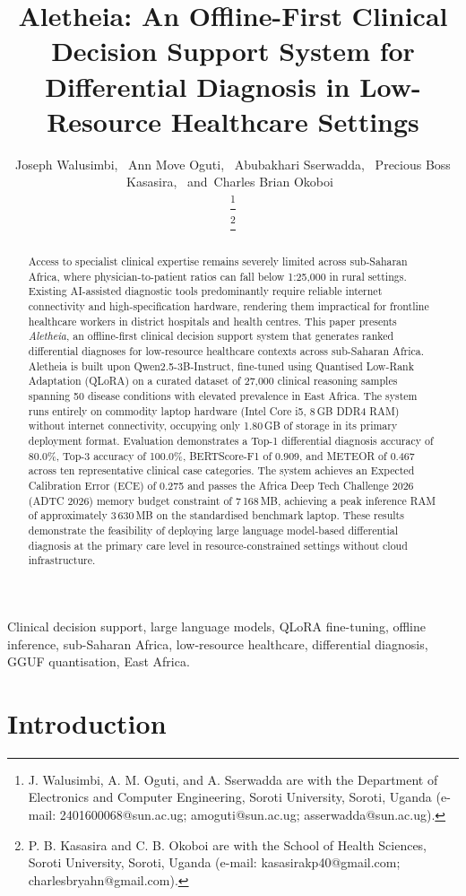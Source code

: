 \documentclass[journal]{IEEEtran}
\title{Aletheia: An Offline-First Clinical Decision Support
System for Differential Diagnosis in Low-Resource Healthcare Settings}
\author{Joseph Walusimbi,~\IEEEmembership{}
  Ann Move Oguti,~\IEEEmembership{}
  Abubakhari Sserwadda,~\IEEEmembership{}
  Precious Boss Kasasira,~\IEEEmembership{}
  and~Charles Brian Okoboi~\IEEEmembership{}

\thanks{J. Walusimbi, A. M. Oguti, and A. Sserwadda are with the
Department of Electronics and Computer Engineering, Soroti University,
Soroti, Uganda (e-mail: 2401600068@sun.ac.ug; amoguti@sun.ac.ug;
asserwadda@sun.ac.ug).}

\thanks{P. B. Kasasira and C. B. Okoboi are with the School of Health
Sciences, Soroti University, Soroti, Uganda
(e-mail: kasasirakp40@gmail.com; charlesbryahn@gmail.com).}}
\begin{document}
\maketitle

\begin{abstract}
Access to specialist clinical expertise remains severely limited
across sub-Saharan Africa, where physician-to-patient ratios can
fall below 1:25{,}000 in rural settings. Existing AI-assisted
diagnostic tools predominantly require reliable internet connectivity
and high-specification hardware, rendering them impractical for
frontline healthcare workers in district hospitals and health
centres. This paper presents \textit{Aletheia}, an offline-first
clinical decision support system that generates ranked differential
diagnoses for low-resource healthcare contexts across sub-Saharan
Africa. Aletheia is built upon Qwen2.5-3B-Instruct, fine-tuned using
Quantised Low-Rank Adaptation (QLoRA) on a curated dataset of
27{,}000 clinical reasoning samples spanning 50 disease conditions
with elevated prevalence in East Africa. The system runs entirely
on commodity laptop hardware (Intel Core i5, 8\,GB DDR4 RAM) without
internet connectivity, occupying only 1.80\,GB of storage in its
primary deployment format. Evaluation demonstrates a Top-1
differential diagnosis accuracy of 80.0\%, Top-3 accuracy of
100.0\%, BERTScore-F1 of 0.909, and METEOR of 0.467 across ten
representative clinical case categories. The system achieves an
Expected Calibration Error (ECE) of 0.275 and passes the Africa
Deep Tech Challenge 2026 (ADTC 2026) memory budget constraint of
7\,168\,MB, achieving a peak inference RAM of approximately
3\,630\,MB on the standardised benchmark laptop. These results
demonstrate the feasibility of deploying large language model-based
differential diagnosis at the primary care level in
resource-constrained settings without cloud infrastructure.
\end{abstract}

\begin{IEEEkeywords}
Clinical decision support, large language models, QLoRA fine-tuning,
offline inference, sub-Saharan Africa, low-resource healthcare,
differential diagnosis, GGUF quantisation, East Africa.
\end{IEEEkeywords}

\section{Introduction}
\label{sec:intro}
\end{document}
